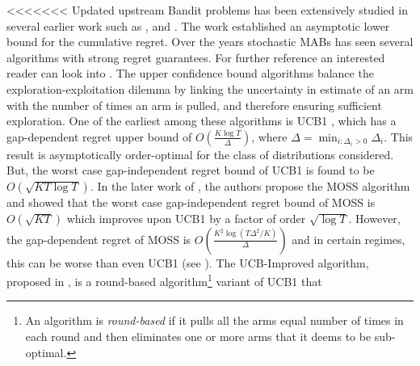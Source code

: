 
<<<<<<< Updated upstream
	Bandit problems has been extensively studied in several earlier work such as \cite{thompson1933likelihood}, \cite{robbins1952some} and \cite{lai1985asymptotically}. The \cite{lai1985asymptotically} work established an asymptotic lower bound for the cumulative regret. Over the years stochastic MABs has seen several algorithms with strong regret guarantees. For further reference an interested reader can look into \cite{bubeck2012bandits}. The upper confidence bound algorithms balance the exploration-exploitation dilemma by linking the uncertainty in estimate of an arm with the number of times an arm is pulled, and therefore ensuring sufficient exploration. One of the earliest among these algorithms is UCB1 \cite{auer2002finite}, which has a gap-dependent regret upper bound of  $O\left(\frac{K\log T}{\Delta}\right)$, where $\Delta = \min_{i:\Delta_i>0} \Delta_i$. This result is asymptotically order-optimal for the class of distributions considered. But, the worst case gap-independent regret bound of UCB1 is found to be  $O \left(\sqrt{KT\log T}\right)$. In the later work of \cite{audibert2009minimax}, the authors propose the MOSS algorithm and showed that the worst case gap-independent regret bound of MOSS is $O\left( \sqrt{KT} \right)$ which improves upon UCB1 by a factor of order $\sqrt{\log T}$. However, the gap-dependent regret of MOSS is $O\left( \frac{K^{2}\log\left(T\Delta^{2}/K\right)}{\Delta}\right)$ and in certain regimes, this can be worse than even UCB1 (see \cite{audibert2009minimax,lattimore2015optimally}). The UCB-Improved algorithm, proposed in \cite{auer2010ucb}, is a round-based algorithm\footnote{An algorithm is \textit{round-based} if it pulls all the arms equal number of times in each round and then eliminates one or more arms that it deems  to be sub-optimal.} variant of UCB1 that 
